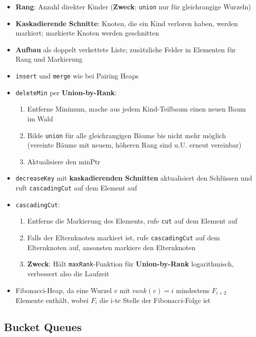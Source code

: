 	\begin{itemize}
	\item \textbf{Rang}: Anzahl direkter Kinder (\textbf{Zweck}: \texttt{union} nur für gleichrangige Wurzeln)
	\item \textbf{Kaskadierende Schnitte}: Knoten, die ein Kind verloren haben, werden markiert; markierte Knoten werden geschnitten
	\item \textbf{Aufbau} als doppelt verkettete Liste; zusätzliche Felder in Elementen für Rang und Markierung
	\item \texttt{insert} und \texttt{merge} wie bei Pairing Heaps
	\item \texttt{deleteMin} per \textbf{Union-by-Rank}:
	\begin{enumerate}
		\item Entferne Minimum, mache aus jedem Kind-Teilbaum einen neuen Baum im Wald
		\item Bilde \texttt{union} für alle gleichrangigen Bäume bis nicht mehr möglich (vereinte Bäume mit neuem, höheren Rang sind u.U. erneut vereinbar)
		\item Aktualisiere den minPtr
	\end{enumerate}
	\item \texttt{decreaseKey} mit \textbf{kaskadierenden Schnitten} aktualisiert den Schlüssen und ruft \texttt{cascadingCut} auf dem Element auf
	\item \texttt{cascadingCut}:
	\begin{enumerate}
		\item Entferne die Markierung des Elements, rufe \texttt{cut} auf dem Element auf
		\item Falls der Elternknoten markiert ist, rufe \texttt{cascadingCut} auf dem Elternknoten auf, ansonsten markiere den Elternknoten
		\item \textbf{Zweck}: Hält \texttt{maxRank}-Funktion für \textbf{Union-by-Rank} logarithmisch, verbessert also die Laufzeit
	\end{enumerate}
	\item Fibonacci-Heap, da eine Wurzel $v$ mit $rank(v) = i$ mindestens $F_{i + 2}$ Elemente enthält, wobei $F_i$ die i-te Stelle der Fibonacci-Folge ist
	\end{itemize}

	\subsection{Bucket Queues}%
	\label{pl:sub:bucket_queues}
	
